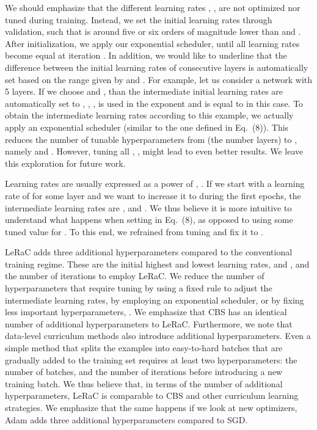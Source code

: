 \documentclass[10pt,twocolumn,letterpaper]{article}
\begin{document}
We should emphasize that the different learning rates , , are not optimized nor tuned during training. Instead, we set the initial learning rates  through validation, such that  is around five or six orders of magnitude lower than  and . After initialization, we apply our exponential scheduler, until all learning rates become equal at iteration . 
In addition, we would like to underline that the difference  between the initial learning rates of consecutive layers is automatically set based on the range given by  and . For example, let us consider a network with 5 layers. If we choose  and , than the intermediate initial learning rates are automatically set to , , , \ie  is used in the exponent and is equal to  in this case. To obtain the intermediate learning rates according to this example, we actually apply an exponential scheduler (similar to the one defined in Eq.~(8)). This reduces the number of tunable hyperparameters from  (the number layers) to , namely  and . However, tuning all , , might lead to even better results. We leave this exploration for future work.

Learning rates are usually expressed as a power of , \eg . If we start with a learning rate of  for some layer  and we want to increase it to  during the first  epochs, the intermediate learning rates are ,  and . We thus believe it is more intuitive to understand what happens when setting  in Eq.~(8), as opposed to using some tuned value for . To this end, we refrained from tuning  and fix it to .

LeRaC adds three additional hyperparameters compared to the conventional training regime. These are the initial highest and lowest learning rates,  and , and the number of iterations  to employ LeRaC. We reduce the number of hyperparameters that require tuning by using a fixed rule to adjust the intermediate learning rates, \eg by employing an exponential scheduler, or by fixing less important hyperparameters, \eg . We emphasize that CBS \cite{Sinha-NIPS-2020} has an identical number of additional hyperparameters to LeRaC. Furthermore, we note that data-level curriculum methods also introduce additional hyperparameters. Even a simple method that splits the examples into easy-to-hard batches that are gradually added to the training set requires at least two hyperparameters: the number of batches, and the number of iterations before introducing a new training batch. We thus believe that, in terms of the number of additional hyperparameters, LeRaC is comparable to CBS and other curriculum learning strategies. We emphasize that the same happens if we look at new optimizers, \eg Adam \cite{Kingma-ICLR-1015} adds three additional hyperparameters compared to SGD.
\end{document}
